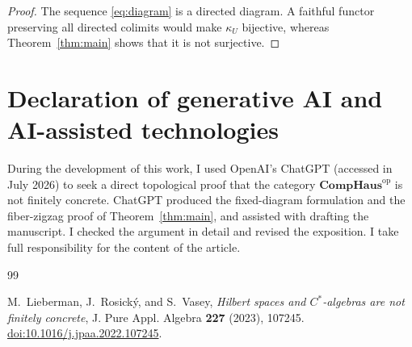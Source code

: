 \documentclass[11pt]{amsart}
\newcommand{\CompHaus}{\mathbf{CompHaus}}
\newcommand{\op}{\mathrm{op}}
\theoremstyle{definition}
\theoremstyle{remark}
\begin{document}
\begin{proof}
The sequence \eqref{eq:diagram} is a directed diagram.  A faithful functor
preserving all directed colimits would make \(\kappa_U\) bijective, whereas
Theorem~\ref{thm:main} shows that it is not surjective.
\end{proof}

\section*{Declaration of generative AI and AI-assisted technologies}

During the development of this work, I used OpenAI's ChatGPT
(accessed in July 2026) to seek a direct topological proof that the category \(\CompHaus^{\op}\) is not finitely concrete.
ChatGPT produced the fixed-diagram formulation and the fiber-zigzag proof of Theorem~\ref{thm:main}, and assisted with drafting the manuscript.
I checked the argument in detail and revised the exposition.
I take full responsibility for the content
of the article.


\begin{thebibliography}{99}

M.~Lieberman, J.~Rosick\'y, and S.~Vasey,
\emph{Hilbert spaces and \(C^*\)-algebras are not finitely concrete},
J. Pure Appl. Algebra \textbf{227} (2023), 107245.
\href{https://doi.org/10.1016/j.jpaa.2022.107245}
  {doi:10.1016/j.jpaa.2022.107245}.

\end{thebibliography}
\end{document}
